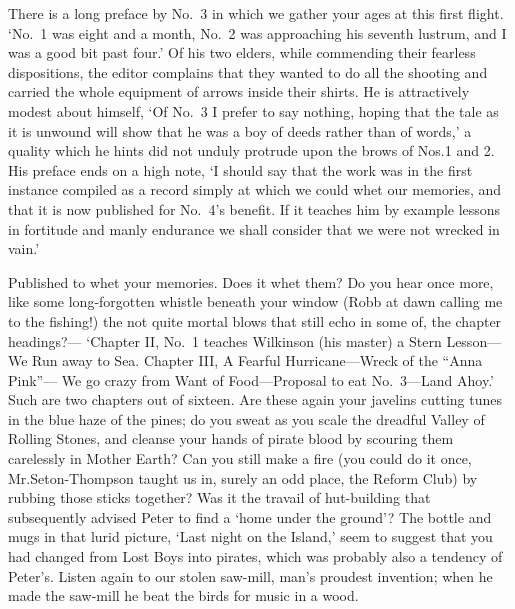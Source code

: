 There is a long preface by No.~3 in which we gather your ages at this first flight.
‘No.~1 was eight and a month,
No.~2 was approaching his seventh lustrum,
and I was a good bit past four.’
Of his two elders, while commending their fearless dispositions,
the editor complains that they wanted to do all the shooting
and carried the whole equipment of arrows inside their shirts.
He is attractively modest about himself,
‘Of No.~3 I prefer to say nothing,
hoping that the tale as it is unwound will show that he was a boy of deeds rather than of words,’
a quality which he hints did not unduly protrude upon the brows of Nos.\@ 1 and 2.
His preface ends on a high note,
‘I should say that the work was in the first instance compiled as a record
simply at which we could whet our memories,
and that it is now published for No.~4’s benefit.
If it teaches him by example lessons in fortitude and manly endurance
we shall consider that we were not wrecked in vain.’

Published to whet your memories.
Does it whet them?
Do you hear once more, like some long-forgotten whistle beneath your window
(Robb at dawn calling me to the fishing!\@)
the not quite mortal blows that still echo in some of, the chapter headings?—%
‘Chapter II, No.~1 teaches Wilkinson (his master) a Stern Lesson—We Run away to Sea.
Chapter III, A Fearful Hurricane—Wreck of the “Anna Pink”—%
We go crazy from Want of Food—Proposal to eat No.~3—Land Ahoy.’
Such are two chapters out of sixteen.
Are these again your javelins cutting tunes in the blue haze of the pines;
do you sweat as you scale the dreadful Valley of Rolling Stones,
and cleanse your hands of pirate blood by scouring them carelessly in Mother Earth?
Can you still make a fire
(you could do it once,
Mr.\@ Seton-Thompson taught us in, surely an odd place, the Reform Club)
by rubbing those sticks together?
Was it the travail of hut-building that subsequently advised Peter to find a ‘home under the ground’?
The bottle and mugs in that lurid picture, ‘Last night on the Island,’
seem to suggest that you had changed from Lost Boys into pirates,
which was probably also a tendency of Peter’s.
Listen again to our stolen saw-mill, man’s proudest invention;
when he made the saw-mill he beat the birds for music in a wood.

